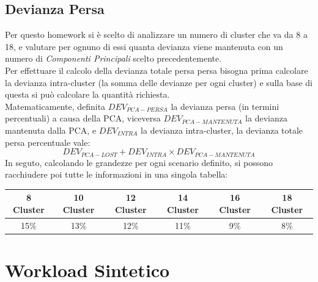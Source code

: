 \subsection{Devianza Persa}
Per questo homework si è scelto di analizzare un numero di cluster che va da 8 a 18, e valutare per ognuno di essi quanta devianza viene mantenuta con un numero di \textit{Componenti Principali} scelto precedentemente. 
\\Per effettuare il calcolo della devianza totale persa persa bisogna prima calcolare la devianza intra-cluster (la somma delle devianze per ogni cluster) e sulla base di questa si può calcolare la quantità richiesta.
\\Matematicamente, definita $DEV_{PCA-PERSA}$ la devianza persa (in termini percentuali) a causa della PCA, viceversa $DEV_{PCA-MANTENUTA}$ la devianza mantenuta dalla PCA, e $DEV_{INTRA}$ la devianza intra-cluster, la devianza totale persa percentuale vale:
\begin{equation*}
	DEV_{PCA-LOST} + DEV_{INTRA}\times DEV_{PCA-MANTENUTA}
\end{equation*}
In seguto, calcolando le grandezze per ogni scenario definito, si possono racchiudere poi tutte le informazioni in una singola tabella:
\begin{center}
	\begin{tabular}{|c|c|c|c|c|c|}
		\hline
		\textbf{8 Cluster} & \textbf{10 Cluster} & \textbf{12 Cluster} &\textbf{14 Cluster}& \textbf{16 Cluster} & \textbf{18 Cluster} \\
		\hline
		15\%& 13\% & 12\% & 11\% & 9\% & 8\% \\
		\hline
	\end{tabular}
\end{center}

\section{Workload Sintetico}
